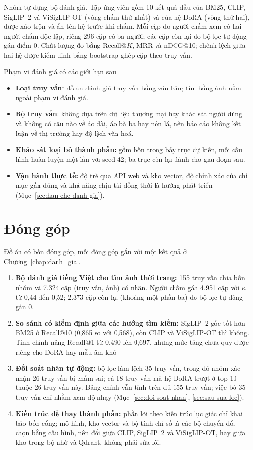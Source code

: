 Nhóm tự dựng bộ đánh giá. Tập ứng viên gồm 10 kết quả đầu của BM25, CLIP, SigLIP~2 và ViSigLIP-OT (vòng chấm thứ nhất) và của hệ DoRA (vòng thứ hai), được xáo trộn và ẩn tên hệ trước khi chấm. Mỗi cặp do người chấm xem có hai người chấm độc lập, riêng 296 cặp có ba người; các cặp còn lại do bộ lọc tự động gán điểm 0. Chất lượng đo bằng Recall@$K$, MRR và nDCG@10; chênh lệch giữa hai hệ được kiểm định bằng bootstrap ghép cặp theo truy vấn.

Phạm vi đánh giá có các giới hạn sau.

\begin{itemize}
    \item \textbf{Loại truy vấn:} đồ án đánh giá truy vấn bằng văn bản; tìm bằng ảnh nằm ngoài phạm vi đánh giá.
    \item \textbf{Bộ truy vấn:} không dựa trên dữ liệu thương mại hay khảo sát người dùng và không có câu nào về áo dài, áo bà ba hay nón lá, nên báo cáo không kết luận về thị trường hay độ lệch văn hoá.
    \item \textbf{Khảo sát loại bỏ thành phần:} gồm bốn trong bảy trục dự kiến, mỗi cấu hình huấn luyện một lần với seed 42; ba trục còn lại dành cho giai đoạn sau.
    \item \textbf{Vận hành thực tế:} độ trễ qua API web và kho vector, độ chính xác của chỉ mục gần đúng và khả năng chịu tải đồng thời là hướng phát triển (Mục~\ref{sec:han-che-danh-gia}).
\end{itemize}

\section{Đóng góp}
\label{sec:dong-gop}

Đồ án có bốn đóng góp, mỗi đóng góp gắn với một kết quả ở Chương~\ref{chap:danh_gia}.

\begin{enumerate}
    \item \textbf{Bộ đánh giá tiếng Việt cho tìm ảnh thời trang:} 155 truy vấn chia bốn nhóm và 7.324 cặp (truy vấn, ảnh) có nhãn. Người chấm gán 4.951 cặp với $\kappa$ từ 0,44 đến 0,52; 2.373 cặp còn lại (khoảng một phần ba) do bộ lọc tự động gán 0.
    \item \textbf{So sánh có kiểm định giữa các hướng tìm kiếm:} SigLIP~2 gốc tốt hơn BM25 ở Recall@10 (0,865 so với 0,568), còn CLIP và ViSigLIP-OT thì không. Tinh chỉnh nâng Recall@1 từ 0,490 lên 0,697, nhưng mức tăng chưa quy được riêng cho DoRA hay mẫu âm khó.
    \item \textbf{Đối soát nhãn tự động:} bộ lọc làm lệch 35 truy vấn, trong đó nhóm xác nhận 26 truy vấn bị chấm sai; cả 18 truy vấn mà hệ DoRA trượt ở top-10 thuộc 26 truy vấn này. Bảng chính vẫn tính trên đủ 155 truy vấn; việc bỏ 35 truy vấn chỉ nhằm xem độ nhạy (Mục~\ref{sec:doi-soat-nhan}, \ref{sec:sau-sua-loc}).
    \item \textbf{Kiến trúc dễ thay thành phần:} phần lõi theo kiến trúc lục giác chỉ khai báo bốn cổng; mô hình, kho vector và bộ tính chỉ số là các bộ chuyển đổi chọn bằng cấu hình, nên đổi giữa CLIP, SigLIP~2 và ViSigLIP-OT, hay giữa kho trong bộ nhớ và Qdrant, không phải sửa lõi.
\end{enumerate}

